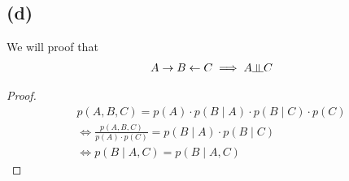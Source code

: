 \documentclass{article}
\newcommand{\dsep}{\rotatebox[origin=c]{90}{$\models$}}
\begin{document}
\subsection*{(d)}
We will proof that 
\begin{align*}
    A \rightarrow B \leftarrow C \implies A \dsep C 
\end{align*}
\begin{proof}
\begin{align*}
	p(A,B,C) = p(A) \cdot p(B \mid A) \cdot p(B \mid C) \cdot p(C) \\
	\Leftrightarrow \frac{p(A,B,C)}{p(A) \cdot p(C)} = p(B\mid A) \cdot p(B\mid C) \\
	\Leftrightarrow p(B \mid A,C) = p(B \mid A,C)
\end{align*}
\end{proof}




\end{document}
